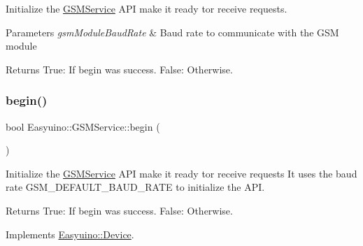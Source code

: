Initialize the \hyperlink{class_easyuino_1_1_g_s_m_service}{G\+S\+M\+Service} A\+PI make it ready tor receive requests. 


\begin{DoxyParams}{Parameters}
{\em gsm\+Module\+Baud\+Rate} & Baud rate to communicate with the G\+SM module \\
\hline
\end{DoxyParams}
\begin{DoxyReturn}{Returns}
True\+: If begin was success. False\+: Otherwise. 
\end{DoxyReturn}
\mbox{\label{class_easyuino_1_1_g_s_m_service_aeafc2dae47e4b13e127eb228a0f7ff6a}} 
\subsubsection{\texorpdfstring{begin()}{begin()}\hspace{0.1cm}{\footnotesize\ttfamily [2/2]}}
{\footnotesize\ttfamily bool Easyuino\+::\+G\+S\+M\+Service\+::begin (\begin{DoxyParamCaption}{ }\end{DoxyParamCaption})\hspace{0.3cm}{\ttfamily [virtual]}}



Initialize the \hyperlink{class_easyuino_1_1_g_s_m_service}{G\+S\+M\+Service} A\+PI make it ready tor receive requests It uses the baud rate G\+S\+M\+\_\+\+D\+E\+F\+A\+U\+L\+T\+\_\+\+B\+A\+U\+D\+\_\+\+R\+A\+TE to initialize the A\+PI. 

\begin{DoxyReturn}{Returns}
True\+: If begin was success. False\+: Otherwise. 
\end{DoxyReturn}


Implements \hyperlink{class_easyuino_1_1_device_a2e7bb2fec849719a9d9432b57cdb72ba}{Easyuino\+::\+Device}.

\mbox{\label{class_easyuino_1_1_g_s_m_service_a8fd764ef215a16f676e6e5e4b283b61d}} 
